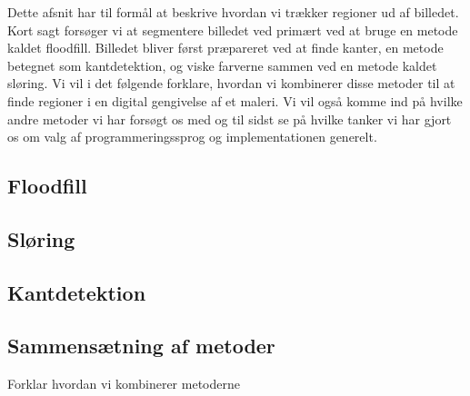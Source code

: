 {
{\sffamily Dette afsnit har til formål at beskrive hvordan vi trækker
regioner ud af billedet. Kort sagt forsøger vi at segmentere billedet
ved primært ved at bruge en metode kaldet floodfill. Billedet bliver
først præpareret ved at finde kanter, en metode betegnet som
kantdetektion, og viske farverne sammen ved en metode kaldet sløring. Vi
vil i det følgende forklare, hvordan vi kombinerer disse metoder til at
finde regioner i en digital gengivelse af et maleri. Vi vil også komme
ind på hvilke andre metoder vi har forsøgt os med og til sidst se på
hvilke tanker vi har gjort os om valg af programmeringssprog og
implementationen generelt.
}

\subsection{Floodfill\label{subsec_floodfill}}                                  %


\subsection{Sløring}                                    %


\subsection{Kantdetektion}                              %


\subsection{Sammensætning af metoder}
Forklar hvordan vi kombinerer metoderne

}


